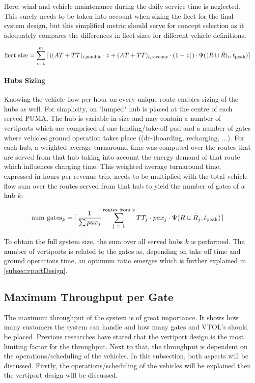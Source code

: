 Here, wind and vehicle maintenance during the daily service time is neglected. This surely needs to be taken into account when sizing the fleet for the final system design, but this simplified metric should serve for concept selection as it adequately compares the differences in fleet sizes for different vehicle definitions.

\begin{align} \label{eq:fleetsize}
    \text{fleet size} = \sum_{i=1}^m { \lceil \left( (AT + TT)_{i, \text{zombie}} \cdot z + (AT + TT)_{i, \text{revenue}} \cdot (1-z) \right) \cdot \Psi((R\cup\bar{R})_i, t_{\text{peak}}) \rceil }
\end{align}


\paragraph{Hubs Sizing}

Knowing the vehicle flow per hour on every unique route enables sizing of the hubs as well. For simplicity, on "lumped" hub is placed at the centre of each served PUMA. The hub is variable in size and may contain a number of vertiports which are comprised of one landing/take-off pad and a number of gates where vehicles ground operation takes place ((de-)boarding, recharging, ...). For each hub, a weighted average turnaround time was computed over the routes that are served from that hub taking into account the energy demand of that route which influences charging time. This weighted average turnaround time, expressed in hours per revenue trip, needs to be multiplied with the total vehicle flow sum over the routes served from that hub to yield the number of gates of a hub $k$:

\begin{align}
    \text{num gates}_k = \lceil \frac{1}{\sum{pax_j}} \sum_{\text{j = 1}}^{\text{routes from k}} {TT_j \cdot pax_j \cdot \Psi(R\cup\bar{R}_j, t_{\text{peak}})} \rceil
\end{align}

To obtain the full system size, the sum over all served hubs $k$ is performed. The number of vertiports is related to the gates as, depending on take off time and ground operations time, an optimum ratio emerges which is further explained in \autoref{subsec:vportDesign}.







\subsection{Maximum Throughput per Gate} \label{subsec:GateThroughput}
The maximum throughput of the system is of great importance. It shows how many customers the system can handle and how many gates and VTOL's should be placed. Previous researches have stated that the vertiport design is the most limiting factor for the throughput. Next to that, the throughput is dependent on the operations/scheduling of the vehicles. In this subsection, both aspects will be discussed. Firstly, the operations/scheduling of the vehicles will be explained then the vertiport design will be discussed.


